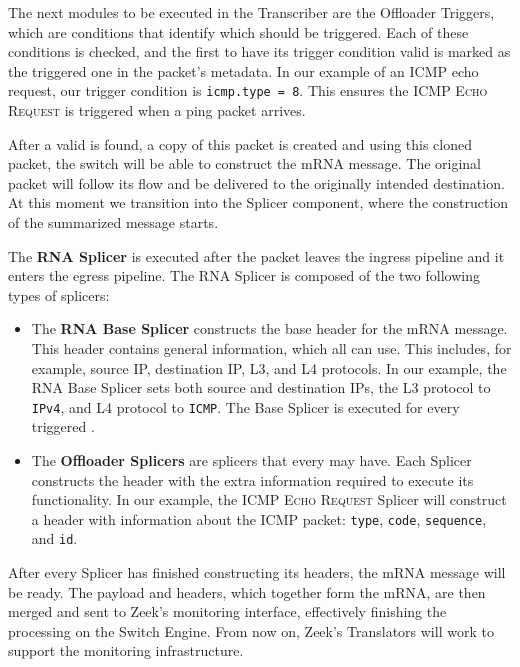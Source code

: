 The next modules to be executed in the Transcriber are the Offloader Triggers, which are conditions that identify which \Offloader{} should be triggered. Each of these conditions is checked, and the first \Offloader{} to have its trigger condition valid is marked as the triggered one in the packet's metadata. In our example of an ICMP echo request, our trigger condition is \texttt{icmp.type = 8}. This ensures the \Offloader{} \textsc{ICMP Echo Request} is triggered when a ping packet arrives.

After a valid \Offloader{} is found, a copy of this packet is created and using this cloned packet, the switch will be able to construct the mRNA message. The original packet will follow its flow and be delivered to the originally intended destination. At this moment we transition into the Splicer component, where the construction of the summarized message starts. 

The \textbf{RNA Splicer} is executed after the packet leaves the ingress pipeline and it enters the egress pipeline\footnotemark{}. The RNA Splicer is composed of the two following types of splicers:

\begin{itemize}
    \item The \textbf{RNA Base Splicer} constructs the base header for the mRNA message. This header contains general information, which all \Offloaders{} can use. This includes, for example, source IP, destination IP, L3, and L4 protocols. In our example, the RNA Base Splicer sets both source and destination IPs, the L3 protocol to \texttt{IPv4}, and L4 protocol to \texttt{ICMP}. The Base Splicer is executed for every triggered \Offloader{}.
    
    \item The \textbf{Offloader Splicers} are splicers that every \Offloader{} may have. Each \Offloader{} Splicer constructs the header with the extra information required to execute its functionality. In our example, the \textsc{ICMP Echo Request} Splicer will construct a header with information about the ICMP packet: \texttt{type}, \texttt{code}, \texttt{sequence}, and \texttt{id}.
\end{itemize}


After every Splicer has finished constructing its headers, the mRNA message will be ready. The payload and headers, which together form the mRNA, are then merged and sent to Zeek's monitoring interface, effectively finishing the processing on the Switch Engine. From now on, Zeek's Translators will work to support the monitoring infrastructure.

